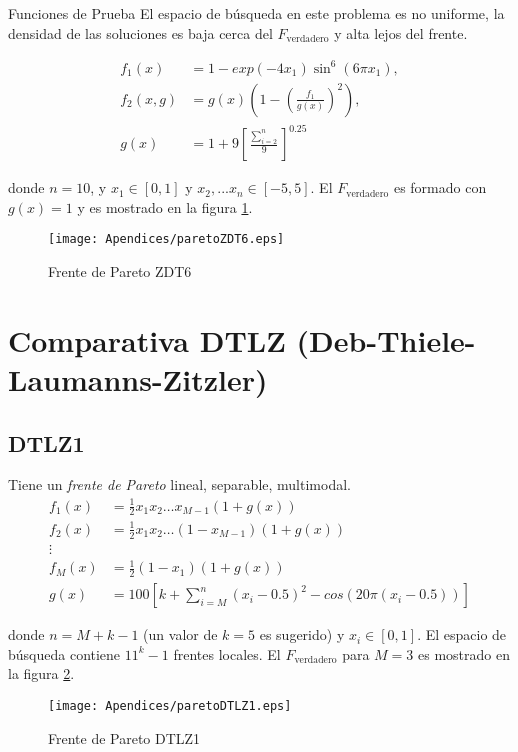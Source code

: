 \begin{chapter}{Funciones de Prueba}
El espacio de b\'usqueda en este problema es no uniforme, la densidad de las soluciones es baja cerca del $F_{\text {verdadero}}$ y alta lejos del frente.



\begin{align*}
f_1(x)&=1-exp(-4x_1)\sin^6(6\pi x_1),\\
f_2(x,g)&=g(x)(1-(\frac{f_1}{g(x)})^2),\\
g(x)&=1+9[\frac{\sum_{i=2}^n}{9}]^{0.25}
\end{align*}



donde $n=10$, y $x_1\in[0,1]$ y $x_2,...x_n\in[-5,5]$. El $F_\text{verdadero}$ es formado con $g(x)=1$ y es mostrado en la figura \ref{fig:ZDT6}.

\begin{figure}[h!]
 \centering
\texttt{[image: Apendices/paretoZDT6.eps]}
\caption{Frente de Pareto ZDT6}
\label{fig:ZDT6}
\end{figure} 



\section{Comparativa DTLZ (Deb-Thiele-Laumanns-Zitzler)} 


\subsection*{DTLZ1}


Tiene un {\it frente de Pareto}  lineal, separable, multimodal.\\


\begin{align*}
f_1(x)&=\frac{1}{2}x_1x_2\hdots x_{M-1}(1+g(x))\\
f_2(x)&=\frac{1}{2}x_1x_2\hdots (1-x_{M-1})(1+g(x))\\
\vdots&\\
f_M(x)&=\frac{1}{2}(1-x_1)(1+g(x))\\
g(x)&=100[k+\sum_{i=M}^n(x_i-0.5)^2-cos(20\pi(x_i-0.5))]
\end{align*}


donde $n=M+k-1$ (un valor de $k=5$ es sugerido) y $x_i\in[0,1]$. El espacio de
b\'usqueda contiene $11^k-1$ frentes locales. El $F_\text{verdadero}$ para $M=3$ es mostrado en la figura \ref{fig:DTLZ1}. 

\begin{figure}[h!]
 \centering
\texttt{[image: Apendices/paretoDTLZ1.eps]}
\caption{Frente de Pareto DTLZ1}
\label{fig:DTLZ1}
\end{figure}




\end{chapter}
